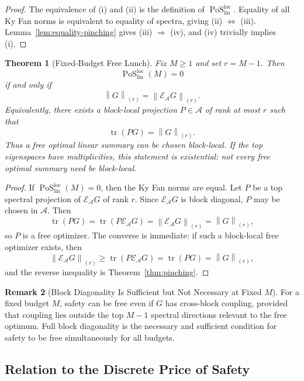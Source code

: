 \documentclass[12pt]{article}
\newtheorem{theorem}{Theorem}[section]
\theoremstyle{definition}
\newtheorem{remark}[theorem]{Remark}
\DeclareMathOperator{\tr}{tr}
\DeclareMathOperator{\PoS}{PoS}
\newcommand{\EA}{\mathcal E_{\mathcal A}}
\newcommand{\KyF}[2]{\left\|#1\right\|_{(#2)}}
\newcommand{\PoSlin}{\PoS_{\mathrm{lin}}^{\mathrm{loc}}}
\begin{document}
\begin{proof}
The equivalence of (i) and (ii) is the definition of $\PoSlin$.  Equality of
all Ky Fan norms is equivalent to equality of spectra, giving
(ii) $\Leftrightarrow$ (iii).  Lemma~\ref{lem:equality-pinching} gives
(iii) $\Rightarrow$ (iv), and (iv) trivially implies (i).
\end{proof}

\begin{theorem}[Fixed-Budget Free Lunch]
\label{thm:pos-fixedM}
Fix $M\ge1$ and set $r=M-1$.  Then
\[
\PoSlin(M)=0
\]
if and only if
\[
\KyF{G}{r}=\KyF{\EA G}{r}.
\]
Equivalently, there exists a block-local projection $P\in\mathcal A$ of rank
at most $r$ such that
\[
\tr(PG)=\KyF{G}{r}.
\]
Thus a free optimal linear summary can be chosen block-local.  If the top
eigenspaces have multiplicities, this statement is existential: not every free
optimal summary need be block-local.
\end{theorem}

\begin{proof}
If $\PoSlin(M)=0$, then the Ky Fan norms are equal.  Let $P$ be a top spectral
projection of $\EA G$ of rank $r$.  Since $\EA G$ is block diagonal, $P$ may
be chosen in $\mathcal A$.  Then
\[
\tr(PG)
=
\tr(P\EA G)
=
\KyF{\EA G}{r}
=
\KyF{G}{r},
\]
so $P$ is a free optimizer.  The converse is immediate: if such a block-local
free optimizer exists, then
\[
\KyF{\EA G}{r}
\ge
\tr(P\EA G)
=
\tr(PG)
=
\KyF{G}{r},
\]
and the reverse inequality is Theorem~\ref{thm:pinching}.
\end{proof}

\begin{remark}[Block Diagonality Is Sufficient but Not Necessary at Fixed $M$]
\label{rem:pos-fixed-not-blockdiag}
For a fixed budget $M$, safety can be free even if $G$ has cross-block
coupling, provided that coupling lies outside the top $M-1$ spectral directions
relevant to the free optimum.  Full block diagonality is the necessary and
sufficient condition for safety to be free simultaneously for all budgets.
\end{remark}

\subsection{Relation to the Discrete Price of Safety}
\label{subsec:pos-discrete}
\end{document}
